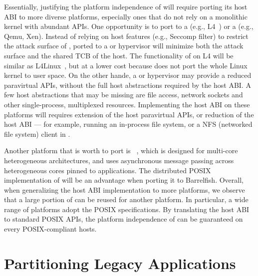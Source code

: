 Essentially,
justifying the platform independence of \graphene{} will
require porting its host ABI to more diverse platforms,
especially ones that do not rely on a monolithic kernel with abundant APIs.
One opportunity is to port \graphene{} to a \term{\microkernel{}}
(e.g., L4~\citep{l4family, klein09sel4}) or a  (e.g., Qemu, Xen).
Instead of relying on host features (e.g., Seccomp filter)
to restrict the attack surface of \picoprocs{},
\graphene{} ported to a \microkernel{} or hypervisor will minimize both the attack surface and the shared TCB of the host.
The functionality of \graphene{} on L4 will be similar as
L4Linux~\citep{hartig97mu},
but at a lower cost because \graphene{} does not port the whole Linux kernel to user space.
On the other hande,
a \microkernel{} or hypervisor
may provide a reduced paravirtual APIs,
without the full host abstractions required by the host ABI.
A few host abstractions that may be missing
are file access, network sockets and other single-process, multiplexed resources.
Implementing the host ABI on these platforms will requires
extension of the host paravirtual APIs, or reduction of the \graphene{} host ABI
--- for example, running an in-process file system, or a NFS (networked file system) client in \picoprocs{}.



Another platform that is worth to port \graphene{} is ~\citep{baumann09barrelfish},
which is designed for multi-core heterogeneous architectures,
and uses asynchronous message passing across heterogeneous cores pinned to applications.
The distributed POSIX implementation of \graphene{}
will be an advantage when porting it to Barrelfish.
Overall, when generalizing the host ABI implementation to more platforms,
we observe that a large portion of \graphene{} \pal{}
can be reused for another platform.
In particular, a wide range of platforms adopt the POSIX specifications.
By translating the \graphene{} host ABI to standard POSIX APIs,
the platform independence of \graphene{} can be guaranteed on
every POSIX-compliant hosts.



\section{Partitioning Legacy Applications}
\label{sec:future:partitioning}


